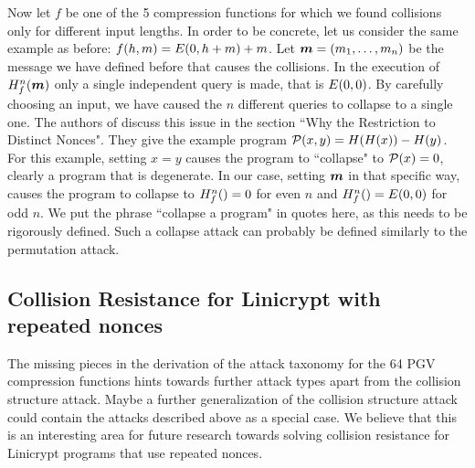 Now let $f$ be one of the 5 compression functions for which we found collisions only for different input lengths.
In order to be concrete, let us consider the same example as before: $f(h,m) = \E(0, h+m) +m$.
Let $\vm = (\dts m n)$ be the message we have defined before that causes the collisions.
In the execution of $\H^n_f(\vm)$ only a single independent query is made, that is $\E(0,0)$.
By carefully choosing an input, we have caused the $n$ different queries to collapse to a single one.
The authors of \cite{TCC:McQSwoRos19} discuss this issue in the section ``Why the Restriction to Distinct Nonces".
They give the example program $\P(x,y) = \H(\H(x)) - \H(y)$.
For this example, setting $x=y$ causes the program to ``collapse" to $\P(x) = 0$,
clearly a program that is degenerate.
In our case, setting $\vm$ in that specific way,
causes the program to collapse to $\H^n_f() = 0$ for even $n$ and $\H^n_f() = E(0,0)$ for odd $n$.
We put the phrase ``collapse a program" in quotes here, as this needs to be rigorously defined.
Such a collapse attack can probably be defined similarly to the permutation attack.

\subsection{Collision Resistance for Linicrypt with repeated nonces}
The missing pieces in the derivation of the attack taxonomy for the 64 PGV compression functions
hints towards further attack types apart from the collision structure attack.
Maybe a further generalization of the collision structure attack could contain the attacks described above as a special case.
We believe that this is an interesting area for future research
towards solving collision resistance for Linicrypt programs that use repeated nonces.

